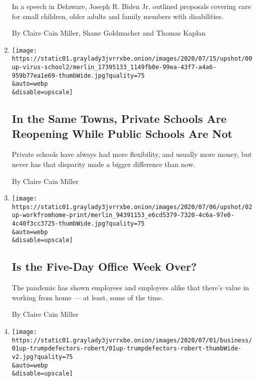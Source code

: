 \begin{enumerate}
  In a speech in Delaware, Joseph R. Biden Jr. outlined proposals
  covering care for small children, older adults and family members with
  disabilities.

  By Claire Cain Miller, Shane Goldmacher and Thomas Kaplan
\item
  \href{/2020/07/16/upshot/coronavirus-school-reopening-private-public-gap.html}{}

  \texttt{[image: https://static01.graylady3jvrrxbe.onion/images/2020/07/15/upshot/00up-virus-school2/merlin\_17395133\_1149fb0e-99ea-43f7-a4a6-959b77ea1e69-thumbWide.jpg?quality=75\\\&auto=webp\\\&disable=upscale]}

  \hypertarget{in-the-same-towns-private-schools-are-reopening-while-public-schools-are-not}{%
  \subsection{In the Same Towns, Private Schools Are Reopening While
  Public Schools Are
  Not}\label{in-the-same-towns-private-schools-are-reopening-while-public-schools-are-not}}

  Private schools have always had more flexibility, and usually more
  money, but never has that disparity made a bigger difference than now.

  By Claire Cain Miller
\item
  \href{/2020/07/02/upshot/is-the-five-day-office-week-over.html}{}

  \texttt{[image: https://static01.graylady3jvrrxbe.onion/images/2020/07/06/upshot/02up-workfromhome-print/merlin\_94391153\_e6cd5379-7320-4c6a-97e0-4c40f3cc3725-thumbWide.jpg?quality=75\\\&auto=webp\\\&disable=upscale]}

  \hypertarget{is-the-five-day-office-week-over}{%
  \subsection{Is the Five-Day Office Week
  Over?}\label{is-the-five-day-office-week-over}}

  The pandemic has shown employees and employers alike that there's
  value in working from home --- at least, some of the time.

  By Claire Cain Miller
\item
  \href{/2020/07/01/upshot/poll-trump-defectors-2020-election.html}{}

  \texttt{[image: https://static01.graylady3jvrrxbe.onion/images/2020/07/01/business/01up-trumpdefectors-robert/01up-trumpdefectors-robert-thumbWide-v2.jpg?quality=75\\\&auto=webp\\\&disable=upscale]}


\end{enumerate}
